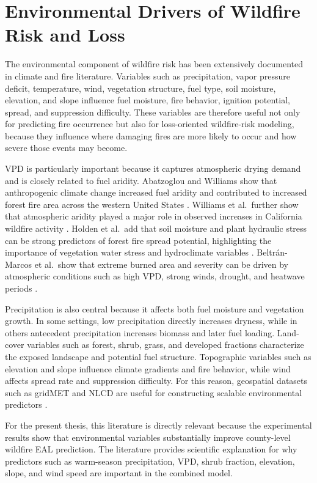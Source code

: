 \section{Environmental Drivers of Wildfire Risk and Loss}

The environmental component of wildfire risk has been extensively documented in climate and fire literature. Variables such as precipitation, vapor pressure deficit, temperature, wind, vegetation structure, fuel type, soil moisture, elevation, and slope influence fuel moisture, fire behavior, ignition potential, spread, and suppression difficulty. These variables are therefore useful not only for predicting fire occurrence but also for loss-oriented wildfire-risk modeling, because they influence where damaging fires are more likely to occur and how severe those events may become.

VPD is particularly important because it captures atmospheric drying demand and is closely related to fuel aridity. Abatzoglou and Williams show that anthropogenic climate change increased fuel aridity and contributed to increased forest fire area across the western United States \citep{abatzoglou2016anthropogenic}. Williams et al.\ further show that atmospheric aridity played a major role in observed increases in California wildfire activity \citep{williams2019observed}. Holden et al.\ add that soil moisture and plant hydraulic stress can be strong predictors of forest fire spread potential, highlighting the importance of vegetation water stress and hydroclimate variables \citep{holden2025soilmoisture}. Beltrán-Marcos et al.\ show that extreme burned area and severity can be driven by atmospheric conditions such as high VPD, strong winds, drought, and heatwave periods \citep{beltranmarcos2026drivers}.

Precipitation is also central because it affects both fuel moisture and vegetation growth. In some settings, low precipitation directly increases dryness, while in others antecedent precipitation increases biomass and later fuel loading. Land-cover variables such as forest, shrub, grass, and developed fractions characterize the exposed landscape and potential fuel structure. Topographic variables such as elevation and slope influence climate gradients and fire behavior, while wind affects spread rate and suppression difficulty. For this reason, geospatial datasets such as gridMET and NLCD are useful for constructing scalable environmental predictors \citep{abatzoglou2013gridmet,dewitz2021nlcd}.

For the present thesis, this literature is directly relevant because the experimental results show that environmental variables substantially improve county-level wildfire EAL prediction. The literature provides scientific explanation for why predictors such as warm-season precipitation, VPD, shrub fraction, elevation, slope, and wind speed are important in the combined model.

